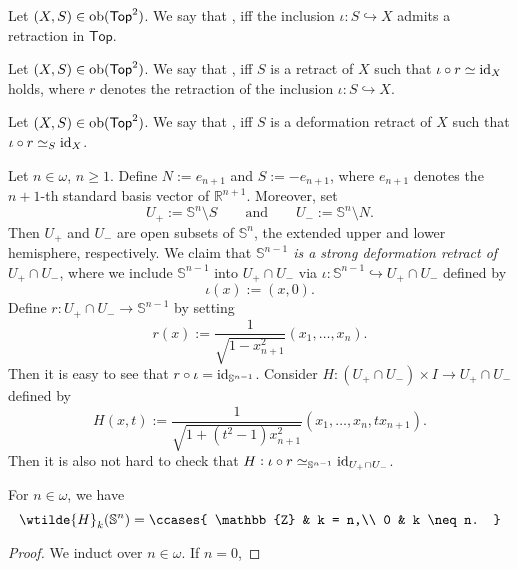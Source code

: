 \begin{definition}[Retract]
	Let $(X,S) \in \operatorname{ob}(\mathsf{Top}^2)$. We say that ,  iff the inclusion $\iota : S \hookrightarrow X$ admits a retraction in $\mathsf{Top}$.
\end{definition}

\begin{definition}
	Let $(X,S) \in \operatorname{ob}(\mathsf{Top}^2)$. We say that , iff $S$ is a retract of $X$ such that $\iota \circ r \simeq \operatorname{id}_X$ holds, where $r$ denotes the retraction of the inclusion $\iota : S \hookrightarrow X$.
\end{definition}

\begin{definition}
	Let $(X,S) \in \operatorname{ob}(\mathsf{Top}^2)$. We say that , iff $S$ is a deformation retract of $X$ such that $\iota \circ r \simeq_S \operatorname{id}_X$.
\end{definition}

\begin{example}
	\label{ex:strong_deformation_retract_spheres}
	Let $n \in \omega$, $n \geq 1$. Define $N := e_{n + 1}$ and $S := -e_{n + 1}$, where $e_{n + 1}$ denotes the $n + 1$-th standard basis vector of $\mathbb{R}^{n + 1}$. Moreover, set
	\begin{equation*}
		U_+ := \mathbb{S}^n \setminus S \qquad \text{and} \qquad U_- := \mathbb{S}^n \setminus N.
	\end{equation*}
	Then $U_+$ and $U_-$ are open subsets of $\mathbb{S}^n$, the extended upper and lower hemisphere, respectively. We claim that \emph{$\mathbb{S}^{n - 1}$ is a strong deformation retract of $U_+ \cap U_-$}, where we include $\mathbb{S}^{n - 1}$ into $U_+ \cap U_-$ via $\iota : \mathbb{S}^{n - 1} \hookrightarrow U_+ \cap U_-$ defined by
	\begin{equation*}
		\iota(x) := (x,0).
	\end{equation*}
	Define $r : U_+ \cap U_- \to \mathbb{S}^{n - 1}$ by setting
	\begin{equation*}
		r(x) := \frac{1}{\sqrt{1 - x_{n + 1}^2}} (x_1,\dots,x_n).
	\end{equation*}
	Then it is easy to see that $r \circ \iota = \operatorname{id}_{\mathbb{S}^{n - 1}}$. Consider $H : (U_+ \cap U_-) \times I \to U_+ \cap U_-$ defined by
	\begin{equation*}
		H(x,t) := \frac{1}{\sqrt{1 + (t^2 - 1)x_{n + 1}^2}}(x_1,\dots,x_n,tx_{n + 1}).
	\end{equation*}
	Then it is also not hard to check that $H : \iota \circ r \simeq_{\mathbb{S}^{n - 1}} \operatorname{id}_{U_+ \cap U_-}$. 
\end{example}

\begin{proposition}
	For $n \in \omega$, we have
	\begin{equation*}
		\wtilde{H}_k(\mathbb{S}^n) = \ccases{
			\mathbb{Z} & k = n,\\
			0 & k \neq n.
		}
	\end{equation*} 
\end{proposition}

\begin{proof}
	We induct over $n \in \omega$. If $n = 0$, 	
\end{proof}
